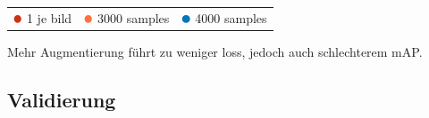\begin{table}[htb]
  \centering
  \begin{tabular}{m{}<{\centering}m{}<{\centering}m{}<{\centering}}
    $\color[HTML]{CC3311}\medbullet$  1 je bild & $\color[HTML]{FF7043}\medbullet$  3000 samples & $\color[HTML]{0077BB}\medbullet$  4000 samples
  \end{tabular}    
\end{table}

Mehr Augmentierung führt zu weniger loss, 
jedoch auch schlechterem mAP.




\subsection{Validierung}


